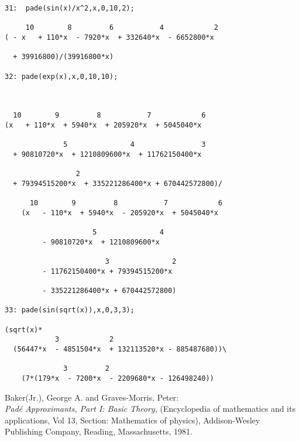 \begin{verbatim}
31:  pade(sin(x)/x^2,x,0,10,2);

     10        8         6           4            2
( - x   + 110*x  - 7920*x  + 332640*x  - 6652800*x

  + 39916800)/(39916800*x)

32: pade(exp(x),x,0,10,10);



  10        9         8           7            6
(x   + 110*x  + 5940*x  + 205920*x  + 5045040*x

              5               4                3
  + 90810720*x  + 1210809600*x  + 11762150400*x

                 2
  + 79394515200*x  + 335221286400*x + 670442572800)/

      10        9         8           7            6
    (x   - 110*x  + 5940*x  - 205920*x  + 5045040*x

                     5               4
         - 90810720*x  + 1210809600*x 

                        3               2
         - 11762150400*x + 79394515200*x  

         - 335221286400*x + 670442572800)

33: pade(sin(sqrt(x)),x,0,3,3);
        
(sqrt(x)*
            3            2
  (56447*x  - 4851504*x  + 132113520*x - 885487680))\

              3         2
    (7*(179*x  - 7200*x  - 2209680*x - 126498240))
\end{verbatim}


\begin{thebibliography}{9}
 Baker(Jr.), George A. and Graves-Morris, Peter:\\
{\it Pad\'{e} Approximants, Part I: Basic Theory},
(Encyclopedia of mathematics and its applications, Vol 13,
Section: Mathematics of physics),
Addison-Wesley Publishing Company, Reading, Massachusetts, 1981.
\end{thebibliography}


